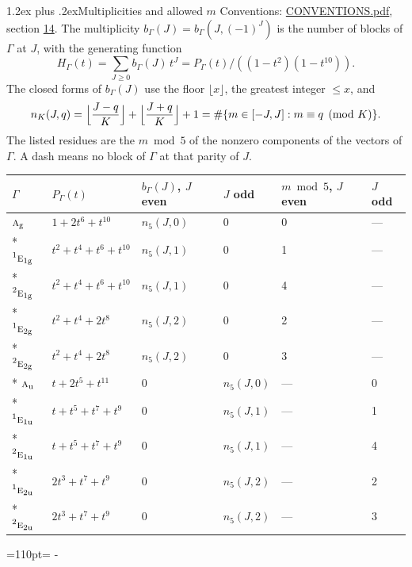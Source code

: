 \documentclass[10pt,a4paper]{article}
\makeatletter
\renewcommand\section{\@startsection{section}{1}{\z@}{-3ex plus -1ex minus -.2ex}%
  {1.2ex plus .2ex}{\normalfont\large\sffamily\bfseries\color{parttitle}}}
\newcommand{\needspace}[1]{\par\penalty-100\begingroup\dimen0=#1\relax\dimen2=\pagegoal
  \advance\dimen2-\pagetotal\ifdim\dimen0>\dimen2\relax\ifdim\dimen2>0pt\vfil\break\fi\fi
  \endgroup}
\numberwithin{equation}{section}
\newcommand{\irr}[1]{\text{\normalfont\scshape #1}}
\newcommand{\conjpair}[1]{{}^{#1}}
\newcommand{\ptag}[1]{\mathrm{#1}}
\makeatother
\begin{document}
\section{Multiplicities and allowed \texorpdfstring{$m$}{m}}\label{s:multiplicities}
Conventions: \href{../../CONVENTIONS.pdf}{CONVENTIONS.pdf}, section \href{../../CONVENTIONS.pdf\#conv.14}{14}.
\leavevmode\label{n:function.generating}\label{n:index.generating.variable}\label{n:function.generating.numerator}The multiplicity $b_\Gamma(J) = b_\Gamma(J, (-1)^J)$ is the number of blocks of $\Gamma$ at $J$, with the generating function
\begin{equation}\label{e:gf}H_\Gamma(t) = \sum_{J\ge0} b_\Gamma(J)\,t^J = P_\Gamma(t)/((1-t^{2})(1-t^{10})).\end{equation}
\leavevmode\label{n:delimiter.floor}\label{n:local.floor.x}\label{n:function.count}\label{n:index.modulus.K}\label{n:index.residue}The closed forms of $b_\Gamma(J)$ use the floor $\lfloor x\rfloor$, the greatest integer $\le x$, and
\begin{equation}\label{e:count}n_K(J,q) = \Bigl\lfloor\frac{J-q}{K}\Bigr\rfloor + \Bigl\lfloor\frac{J+q}{K}\Bigr\rfloor + 1 = \#\{m\in[-J,J] : m\equiv q \pmod{K}\}.\end{equation}
\leavevmode\label{n:head.parity}The listed residues are the $m \bmod 5$ of the nonzero components of the vectors of $\Gamma$. A dash means no block of $\Gamma$ at that parity of $J$.
{\small\begin{longtable}{@{}llllll@{}}\toprule
$\Gamma$ & $P_\Gamma(t)$ & $b_\Gamma(J)$, $J$ even & $J$ odd & $m \bmod 5$, $J$ even & $J$ odd\\\midrule\endhead
\bottomrule\endfoot\endlastfoot
$\irr{a}_{\ptag{g}}$ & $1 + 2t^{6} + t^{10}$ & $n_{5}(J,0)$ & $0$ & 0 & ---\\*
$\conjpair{1}\irr{e}_{1\ptag{g}}$ & $t^{2} + t^{4} + t^{6} + t^{10}$ & $n_{5}(J,1)$ & $0$ & 1 & ---\\*
$\conjpair{2}\irr{e}_{1\ptag{g}}$ & $t^{2} + t^{4} + t^{6} + t^{10}$ & $n_{5}(J,1)$ & $0$ & 4 & ---\\*
$\conjpair{1}\irr{e}_{2\ptag{g}}$ & $t^{2} + t^{4} + 2t^{8}$ & $n_{5}(J,2)$ & $0$ & 2 & ---\\*
$\conjpair{2}\irr{e}_{2\ptag{g}}$ & $t^{2} + t^{4} + 2t^{8}$ & $n_{5}(J,2)$ & $0$ & 3 & ---\\*
$\irr{a}_{\ptag{u}}$ & $t + 2t^{5} + t^{11}$ & $0$ & $n_{5}(J,0)$ & --- & 0\\*
$\conjpair{1}\irr{e}_{1\ptag{u}}$ & $t + t^{5} + t^{7} + t^{9}$ & $0$ & $n_{5}(J,1)$ & --- & 1\\*
$\conjpair{2}\irr{e}_{1\ptag{u}}$ & $t + t^{5} + t^{7} + t^{9}$ & $0$ & $n_{5}(J,1)$ & --- & 4\\*
$\conjpair{1}\irr{e}_{2\ptag{u}}$ & $2t^{3} + t^{7} + t^{9}$ & $0$ & $n_{5}(J,2)$ & --- & 2\\*
$\conjpair{2}\irr{e}_{2\ptag{u}}$ & $2t^{3} + t^{7} + t^{9}$ & $0$ & $n_{5}(J,2)$ & --- & 3\\
\bottomrule\end{longtable}}
\needspace{110pt}
\end{document}
